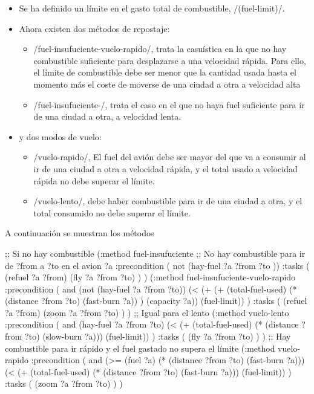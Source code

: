 \documentclass[	DIV=calc,%
							paper=a4,%
							fontsize=11pt]{scrartcl}	 					%
\begin{document}
\begin{itemize}
	\item Se ha definido un límite en el gasto total de combustible, \newlispinline/(fuel-limit)/.
	\item Ahora existen dos métodos de repostaje:
	\begin{itemize}
		\item \newlispinline/fuel-insufuciente-vuelo-rapido/, trata la casuística en la que no hay combustible suficiente para desplazarse a una velocidad rápida. Para ello, el límite de combustible debe ser menor que la cantidad usada hasta el momento más el coste de moverse de una ciudad a otra a velocidad alta
		\item \newlispinline/fuel-insufuciente-/, trata el caso en el que no haya fuel suficiente para ir de una ciudad a otra, a velocidad lenta.
	\end{itemize}
	\item y dos modos de vuelo:
	\begin{itemize}
		\item \newlispinline/vuelo-rapido/, El fuel del avión debe ser mayor del que va a consumir al ir de una ciudad a otra a velocidad rápida, y el total usado a velocidad rápida no debe superar el límite.
		\item \newlispinline/vuelo-lento/, debe haber combustible para ir de una ciudad a otra, y el total consumido no debe superar el límite.
	\end{itemize}
\end{itemize}

A continuación se muestran los métodos

\begin{newlispcode}
;; Si no hay combustible
(:method fuel-insufuciente
	;; No hay combustible para ir de ?from a ?to en el avion ?a
	:precondition ( not (hay-fuel ?a ?from ?to ))
	:tasks (
		(refuel ?a ?from)
		(fly ?a ?from ?to)
	)
)
(:method fuel-insufuciente-vuelo-rapido
	:precondition (
			and
			(not (hay-fuel ?a ?from ?to))
			(< (+ (+ (total-fuel-used)
							(* (distance ?from ?to) (fast-burn ?a)) )
						(capacity ?a)) (fuel-limit))
	)
	:tasks (
			(refuel ?a ?from)
			(zoom ?a ?from ?to)
	)
)
;; Igual para el lento
(:method vuelo-lento
	:precondition (
			and
			(hay-fuel ?a ?from ?to)
			(<  (+ (total-fuel-used)
					(* (distance ?from ?to) (slow-burn ?a)))
				(fuel-limit))
	)
	:tasks (
			(fly ?a ?from ?to)
	)
)
;; Hay combustible para ir rápido y el fuel gastado no supera el límite
(:method vuelo-rapido
	:precondition (
			and
			(>= (fuel ?a)
				(*  (distance ?from ?to)
						(fast-burn ?a)))
			(< (+ (total-fuel-used)
				(* (distance ?from ?to) (fast-burn ?a)))
			(fuel-limit))
	)
	:tasks (
			(zoom ?a ?from ?to)
	)
)
\end{newlispcode}
\end{document}
